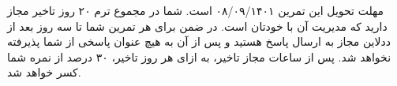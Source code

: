 \noindent
مهلت تحویل این تمرین ۰۸/۰۹/۱۴۰۱ است. شما در مجموع ترم  ۲۰ روز تاخیر مجاز دارید که مدیریت آن با خودتان است. در
ضمن برای هر تمرین شما تا سه روز بعد از ددلاین مجاز به ارسال پاسخ هستید و پس از آن به هیچ عنوان پاسخی از شما پذیرفته
نخواهد شد. پس از ساعات مجاز تاخیر، به ازای هر روز تاخیر،  ٣٠ درصد از نمره شما کسر خواهد شد.
